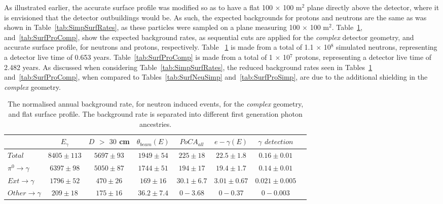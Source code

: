 As illustrated earlier, the accurate surface profile was modified so as to have a flat 100 $\times$ 100 m$^{2}$ plane directly above the detector, where it is envisioned that the detector outbuildings would be. As such, the expected backgrounds for protons and neutrons are the same as was shown in Table~\ref{tab:SimpSurfRates}, as these particles were sampled on a plane measuring 100 $\times$ 100 m$^{2}$. Table~\ref{tab:SurfNeuComp}, and~\ref{tab:SurfProComp}, show the expected background rates, as sequential cuts are applied for the \emph{complex} detector geometry, and accurate surface profile, for neutrons and protons, respectively. Table ~\ref{tab:SurfNeuComp} is made from a total of 1.1 $\times$ 10$^8$ simulated neutrons, representing a detector live time of 0.653 years. Table~\ref{tab:SurfProComp} is made from a total of 1 $\times$ 10$^7$ protons, representing a detector live time of 2.482 years. As discussed when considering Table~\ref{tab:SimpSurfRates}, the reduced background rates seen in Tables~\ref{tab:SurfNeuComp} and~\ref{tab:SurfProComp}, when compared to Tables~\ref{tab:SurfNeuSimp} and~\ref{tab:SurfProSimp}, are due to the additional shielding in the \emph{complex} geometry. \\

\begin{table}[h!]
  \caption[The normalised annual background rate, for neutron induced events, for the \emph{complex} geometry, and flat surface profile]
          {The normalised annual background rate, for neutron induced events, for the \emph{complex} geometry, and flat surface profile. The background rate is separated into different first generation photon ancestries.}
  \label{tab:SurfNeuComp}
  \centering
  \scriptsize
  \begin{tabular}{l c c c c c c c }
    \toprule
        & $E_\gamma$ &  $D$ $>$ $30$ cm & $\theta_{beam}(E)$ & $PoCA_{all}$ & $e-\gamma(E)$ & $\gamma$ $detection$ \\
        \midrule
        $Total$          & $8405\pm113$ & $5697\pm93$ & $1949\pm54$  & $225\pm18$   & $22.5\pm1.8$  & $0.16\pm0.01$ \\

        $\pi^0\to\gamma$ & $6397\pm98$  & $5050\pm87$ & $1744\pm51$  & $194\pm17$   & $19.4\pm1.7$  & $0.14\pm0.01$ \\

        $Ext\to\gamma$   & $1796\pm52$  & $470\pm26$  & $169\pm16$   & $30.1\pm6.7$ & $3.01\pm0.67$ & $0.021\pm0.005$ \\

        $Other\to\gamma$ & $209\pm18$   & $175\pm16$  & $36.2\pm7.4$ & $0-3.68$     & $0-0.37$      & $0-0.003$ \\
        \bottomrule
  \end{tabular}
\end{table}

